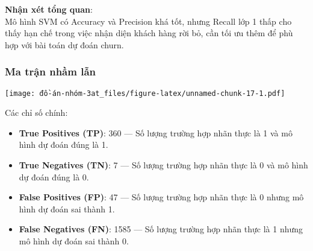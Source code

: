 \documentclass[
]{article}
\newenvironment{Shaded}{\begin{snugshade}}{\end{snugshade}}
\newcommand{\AttributeTok}[1]{\textcolor[rgb]{0.13,0.29,0.53}{#1}}
\newcommand{\FunctionTok}[1]{\textcolor[rgb]{0.13,0.29,0.53}{\textbf{#1}}}
\newcommand{\NormalTok}[1]{#1}
\newcommand{\OtherTok}[1]{\textcolor[rgb]{0.56,0.35,0.01}{#1}}
\newcommand{\SpecialCharTok}[1]{\textcolor[rgb]{0.81,0.36,0.00}{\textbf{#1}}}
\newcommand{\StringTok}[1]{\textcolor[rgb]{0.31,0.60,0.02}{#1}}
\providecommand{\tightlist}{%
  \setlength{\itemsep}{0pt}\setlength{\parskip}{0pt}}
\begin{document}
\textbf{Nhận xét tổng quan}:\\
Mô hình SVM có Accuracy và Precision khá tốt, nhưng Recall lớp 1 thấp
cho thấy hạn chế trong việc nhận diện khách hàng rời bỏ, cần tối ưu thêm
để phù hợp với bài toán dự đoán churn.

\subsubsection{Ma trận nhầm lẫn}\label{sec-svm-cm}

\begin{Shaded}
\end{Shaded}

\texttt{[image: đồ-án-nhóm-3at\_files/figure-latex/unnamed-chunk-17-1.pdf]}

Các chỉ số chính:

\begin{itemize}
\tightlist
\item
  \textbf{True Positives (TP)}: 360 --- Số lượng trường hợp nhãn thực là
  1 và mô hình dự đoán đúng là 1.
\item
  \textbf{True Negatives (TN)}: 7 --- Số lượng trường hợp nhãn thực là 0
  và mô hình dự đoán đúng là 0.
\item
  \textbf{False Positives (FP)}: 47 --- Số lượng trường hợp nhãn thực là
  0 nhưng mô hình dự đoán sai thành 1.
\item
  \textbf{False Negatives (FN)}: 1585 --- Số lượng trường hợp nhãn thực
  là 1 nhưng mô hình dự đoán sai thành 0.
\end{itemize}
\end{document}

